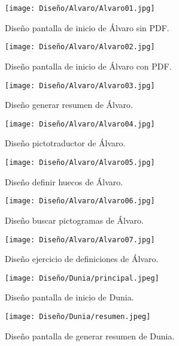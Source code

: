 \begin{figure}[ht!]
  \centering
  \texttt{[image: Diseño/Alvaro/Alvaro01.jpg]}
  \caption{Diseño pantalla de inicio de Álvaro sin PDF.}
  \label{fig:disenyoAlvaro01}
\end{figure}

\begin{figure}[ht!]
  \centering
  \texttt{[image: Diseño/Alvaro/Alvaro02.jpg]}
  \caption{Diseño pantalla de inicio de Álvaro con PDF.}
  \label{fig:disenyoAlvaro02}
\end{figure}

\begin{figure}[ht!]
  \centering
  \texttt{[image: Diseño/Alvaro/Alvaro03.jpg]}
  \caption{Diseño generar resumen de Álvaro.}
  \label{fig:disenyoAlvaro03}
\end{figure}

\begin{figure}[ht!]
  \centering
  \texttt{[image: Diseño/Alvaro/Alvaro04.jpg]}
  \caption{Diseño pictotraductor de Álvaro.}
  \label{fig:disenyoAlvaro04}
\end{figure}

\begin{figure}[ht!]
  \centering
  \texttt{[image: Diseño/Alvaro/Alvaro05.jpg]}
  \caption{Diseño definir huecos de Álvaro.}
  \label{fig:disenyoAlvaro05}
\end{figure}

\begin{figure}[ht!]
  \centering
  \texttt{[image: Diseño/Alvaro/Alvaro06.jpg]}
  \caption{Diseño buscar pictogramas de Álvaro.}
  \label{fig:disenyoAlvaro06}
\end{figure}

\begin{figure}[ht!]
  \centering
  \texttt{[image: Diseño/Alvaro/Alvaro07.jpg]}
  \caption{Diseño ejercicio de definiciones de Álvaro.}
  \label{fig:disenyoAlvaro07}
\end{figure}

\begin{figure}[ht!]
  \centering
  \texttt{[image: Diseño/Dunia/principal.jpeg]}
  \caption{Diseño pantalla de inicio de Dunia.}
  \label{dunia1}
\end{figure}

\begin{figure}[ht!]
  \centering
  \texttt{[image: Diseño/Dunia/resumen.jpeg]}
  \caption{Diseño pantalla de generar resumen de Dunia.}
  \label{dunia2}
\end{figure}

